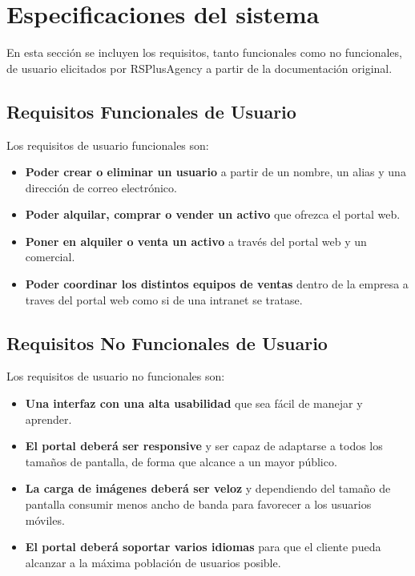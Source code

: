 \chapter{Especificaciones del sistema}
\par En esta sección se incluyen los requisitos, tanto funcionales como no funcionales, de usuario elicitados por RSPlusAgency a partir de la documentación original.

\section{Requisitos Funcionales de Usuario}
\par Los requisitos de usuario funcionales son:
\begin{itemize}
	\item \textbf{Poder crear o eliminar un usuario} a partir de un nombre, un alias y una dirección de correo electrónico.
	\item \textbf{Poder alquilar, comprar o vender un activo} que ofrezca el portal web.
	\item \textbf{Poner en alquiler o venta un activo} a través del portal web y un comercial.
	\item \textbf{Poder coordinar los distintos equipos de ventas} dentro de la empresa a traves del portal web como si de una intranet se tratase.
\end{itemize}

\section{Requisitos No Funcionales de Usuario}
\par Los requisitos de usuario no funcionales son:
\begin{itemize}
	\item \textbf{Una interfaz con una alta usabilidad} que sea fácil de manejar y aprender.
	\item \textbf{El portal deberá ser responsive} y ser capaz de adaptarse a todos los tamaños de pantalla, de forma que alcance a un mayor público.
	\item \textbf{La carga de imágenes deberá ser veloz} y dependiendo del tamaño de pantalla consumir menos ancho de banda para favorecer a los usuarios móviles.
	\item \textbf{El portal deberá soportar varios idiomas} para que el cliente pueda alcanzar a la máxima población de usuarios posible.
\end{itemize}
